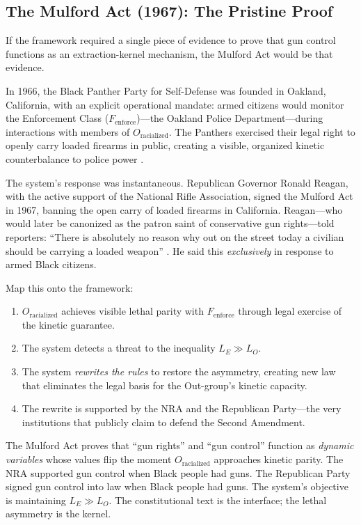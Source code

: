 \subsection{The Mulford Act (1967): The Pristine Proof}
\label{sec:mulford}

If the framework required a single piece of evidence to prove that gun control functions as an extraction-kernel mechanism, the Mulford Act would be that evidence.

In 1966, the Black Panther Party for Self-Defense was founded in Oakland, California, with an explicit operational mandate: armed citizens would monitor the Enforcement Class ($F_{\text{enforce}}$)---the Oakland Police Department---during interactions with members of $O_{\text{racialized}}$. The Panthers exercised their legal right to openly carry loaded firearms in public, creating a visible, organized kinetic counterbalance to police power \cite{bloom2013, mulford1967}.

The system's response was instantaneous. Republican Governor Ronald Reagan, with the active support of the National Rifle Association, signed the Mulford Act in 1967, banning the open carry of loaded firearms in California. Reagan---who would later be canonized as the patron saint of conservative gun rights---told reporters: ``There is absolutely no reason why out on the street today a civilian should be carrying a loaded weapon'' \cite{winkler2011}. He said this \textit{exclusively} in response to armed Black citizens.

Map this onto the framework:

\begin{enumerate}
    \item $O_{\text{racialized}}$ achieves visible lethal parity with $F_{\text{enforce}}$ through legal exercise of the kinetic guarantee.
    \item The system detects a threat to the inequality $L_E \gg L_O$.
    \item The system \textit{rewrites the rules} to restore the asymmetry, creating new law that eliminates the legal basis for the Out-group's kinetic capacity.
    \item The rewrite is supported by the NRA and the Republican Party---the very institutions that publicly claim to defend the Second Amendment.
\end{enumerate}

The Mulford Act proves that ``gun rights'' and ``gun control'' function as \textit{dynamic variables} whose values flip the moment $O_{\text{racialized}}$ approaches kinetic parity. The NRA supported gun control when Black people had guns. The Republican Party signed gun control into law when Black people had guns. The system's objective is maintaining $L_E \gg L_O$. The constitutional text is the interface; the lethal asymmetry is the kernel.

